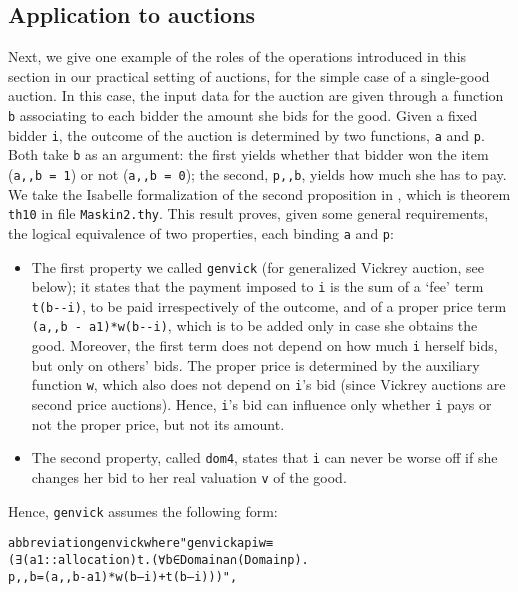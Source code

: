\documentclass[
]{llncs}
\newenvironment{mytable}{
\vspace{0.2ex}
\begin{center}\begin{minipage}
{0.9\textwidth}\renewcommand{\baselinestretch}{0.75}\begin{small}}
{\end{small}\end{minipage}\end{center}
\vspace{0.1ex}
}
\newcommand{\fee}{fee}
\newcommand{\he}{she}
\newcommand{\his}{her}
\newcommand{\himself}{herself}
\newcommand{\I}{Isabelle}
\begin{document}
\subsection{Application to auctions}
\label{RefFuncAsGraphApplication}
Next, we give one example of the roles of the operations introduced in this section
in our practical setting of auctions, for the simple case of a single-good auction.
In this case, the input data for the auction are given through a function \verb|b| associating to each bidder the amount \he{} bids for the good.
Given a fixed bidder \verb|i|, the outcome of the auction is determined by two functions, \verb|a| and \verb|p|.
Both take \verb|b| as an argument: the first yields whether that bidder won the item (\verb|a,,b = 1|) or not (\verb|a,,b = 0|); the second, \verb|p,,b|, yields how much \he{} has to pay.
We take the \I{} formalization of the second proposition in \cite{mas-04}, which is theorem \verb|th10| in file \verb|Maskin2.thy|.
This result proves, given some general requirements, the logical equivalence of two properties, each binding \verb|a| and \verb|p|:
\begin{itemize}
\item
The first property we called \verb|genvick| (for generalized Vickrey auction, see below); it states that the payment imposed to \verb|i| is the sum of a `\fee{}' term \verb|t(b--i)|, 
to be paid irrespectively of the outcome, and of a proper price term \verb|(a,,b - a1)*w(b--i)|, 
which is to be added only in case \he{} obtains the good.
Moreover, the first term does not depend on how much \verb|i| \himself{} bids, but only on others' bids.
The proper price is determined by the auxiliary function \verb|w|, which also does not depend on \verb|i|'s bid (since Vickrey auctions are second price auctions).
Hence, \verb|i|'s bid can influence only whether \verb|i| pays or not the proper price, but not its amount.
\item
The second property, called \verb|dom4|, states that \verb|i| can never be worse off if \he{} changes \his{} bid to \his{} real valuation \verb|v| of the good.
\end{itemize}
Hence, \verb|genvick| assumes the following form:
\begin{mytable}
\begin{alltt}
abbreviation genvick where "genvick a p i w ≡ 
(∃ (a1::allocation) t. (∀ b ∈ Domain a ∩ (Domain p). 
p,,b  =  (a,,b - a1)*w(b--i) + t(b--i)  ))",
\end{alltt}
\end{mytable}
\end{document}
